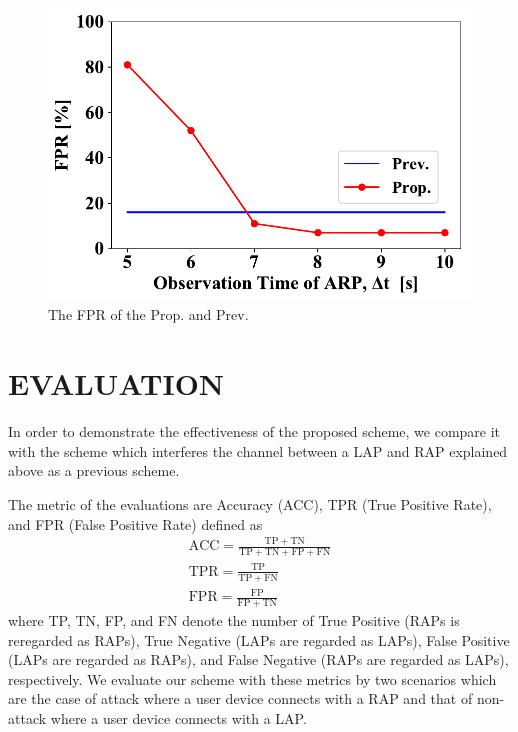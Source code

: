 \documentclass[conference]{IEEEtran}
\begin{document}
\begin{figure}[ht]
\begin{minipage}{0.33\hsize}
        \begin{center}
            \includegraphics[scale=0.4]{figure/FPR.pdf}
        \end{center}
        \caption{The FPR of the Prop. and Prev.}
        \label{fig:fpr}
    \end{minipage}

\end{figure}

\section{EVALUATION}\label{sec:5}
In order to demonstrate the effectiveness of the proposed scheme, we compare it with the scheme \cite{previous} which interferes the channel between a LAP and RAP explained above as a previous scheme.

The metric of the evaluations are Accuracy (ACC), TPR (True Positive Rate), and FPR (False Positive Rate) defined as
\begin{gather}
    \mathrm{ACC} = \frac{\mathrm{TP} + \mathrm{TN}}{\mathrm{TP} + \mathrm{TN} + \mathrm{FP} + \mathrm{FN}} \\
    \mathrm{TPR} = \frac{\mathrm{TP}}{\mathrm{TP} + \mathrm{FN}} \\
    \mathrm{FPR} = \frac{\mathrm{FP}}{\mathrm{FP} + \mathrm{TN}}
\end{gather}
where TP, TN, FP, and FN denote the number of True Positive (RAPs is reregarded as RAPs), True Negative (LAPs are regarded as LAPs), False Positive (LAPs are regarded as RAPs), and False Negative (RAPs are regarded as LAPs), respectively.
We evaluate our scheme with these metrics by two scenarios which are the case of attack where a user device connects with a RAP and that of non-attack where a user device connects with a LAP.
\end{document}
